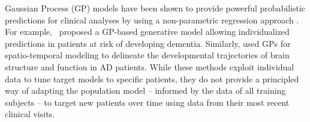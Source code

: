\documentclass{article}
\begin{document}
Gaussian Process (GP) models have been shown to provide powerful probabilistic predictions for clinical analyses by using a non-parametric regression approach \citep{ziegler2014,lorenzi2017,lorenzi2015a,hyun2016}. For example,~\citet{ziegler2014} proposed a GP-based generative model allowing individualized predictions in patients at risk of developing dementia. 
Similarly, \citet{lorenzi2015a,hyun2016} used GPs for spatio-temporal modeling to delineate the developmental trajectories of brain structure and function in AD patients. While these methods exploit individual data to tune target models to specific patients, they do not provide a principled way of adapting the population model -- informed by the data of all training subjects -- to target new patients over time using data from their most recent clinical visits.




\end{document}
